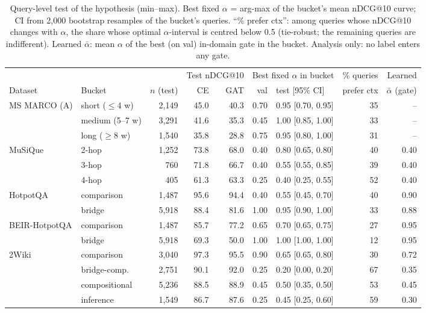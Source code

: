 \begin{table}[t]
\centering\small\setlength{\tabcolsep}{4pt}
\begin{tabular}{llrrrrlrr}
\toprule
 & & & \multicolumn{2}{c}{Test nDCG@10} & \multicolumn{2}{c}{Best fixed $\alpha$ in bucket} & \% queries & Learned \\
\cmidrule(lr){4-5}\cmidrule(lr){6-7}
Dataset & Bucket & $n$ (test) & CE & GAT & val & test [95\% CI] & prefer ctx & $\bar\alpha$ (gate) \\
\midrule
MS MARCO (A) & short ($\le$4 w) & 2,149 & 45.0 & 40.3 & 0.70 & 0.95 [0.70, 0.95] & 35 & -- \\
 & medium (5--7 w) & 3,291 & 41.6 & 35.3 & 0.45 & 1.00 [0.85, 1.00] & 33 & -- \\
 & long ($\ge$8 w) & 1,540 & 35.8 & 28.8 & 0.75 & 0.95 [0.80, 1.00] & 31 & -- \\
\midrule
MuSiQue & 2-hop & 1,252 & 73.8 & 68.0 & 0.40 & 0.80 [0.65, 0.80] & 40 & 0.40 \\
 & 3-hop & 760 & 71.8 & 66.7 & 0.40 & 0.55 [0.55, 0.85] & 39 & 0.40 \\
 & 4-hop & 405 & 61.3 & 63.3 & 0.25 & 0.40 [0.25, 0.55] & 52 & 0.40 \\
\midrule
HotpotQA & comparison & 1,487 & 95.6 & 94.4 & 0.40 & 0.55 [0.45, 0.70] & 40 & 0.90 \\
 & bridge & 5,918 & 88.4 & 81.6 & 1.00 & 0.95 [0.90, 1.00] & 33 & 0.88 \\
\midrule
BEIR-HotpotQA & comparison & 1,487 & 85.7 & 77.2 & 0.65 & 0.70 [0.65, 0.75] & 27 & 0.95 \\
 & bridge & 5,918 & 69.3 & 50.0 & 1.00 & 1.00 [1.00, 1.00] & 12 & 0.95 \\
\midrule
2Wiki & comparison & 3,040 & 97.3 & 95.5 & 0.90 & 0.65 [0.65, 0.80] & 30 & 0.72 \\
 & bridge-comp. & 2,751 & 90.1 & 92.0 & 0.25 & 0.20 [0.00, 0.20] & 67 & 0.35 \\
 & compositional & 5,236 & 88.5 & 88.9 & 0.45 & 0.50 [0.35, 0.50] & 53 & 0.45 \\
 & inference & 1,549 & 86.7 & 87.6 & 0.25 & 0.45 [0.25, 0.60] & 59 & 0.30 \\
\bottomrule
\end{tabular}
\caption{Query-level test of the hypothesis (min--max). Best fixed $\alpha$ = arg-max of the bucket's mean nDCG@10 curve; CI from 2{,}000 bootstrap resamples of the bucket's queries. ``\% prefer ctx'': among queries whose nDCG@10 changes with $\alpha$, the share whose optimal $\alpha$-interval is centred below 0.5 (tie-robust; the remaining queries are indifferent). Learned $\bar\alpha$: mean $\alpha$ of the best (on val) in-domain gate in the bucket. Analysis only: no label enters any gate.}
\label{tab:bucket}
\end{table}
